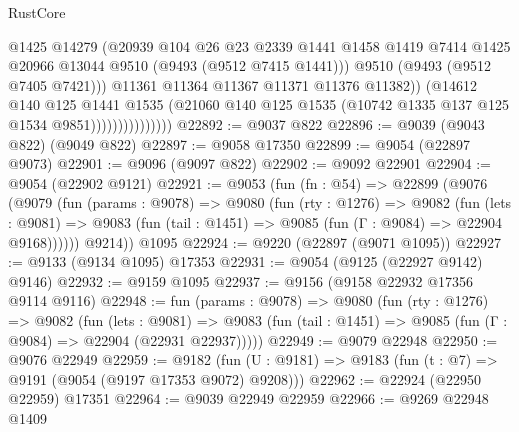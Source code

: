\begin{lexlean}{RustCore}
\begin{coremodule}
                                  @1425
                                  @14279
                                  (@20939
                                    @104
                                    @26
                                    @23
                                    @2339
                                    @1441
                                    @1458
                                    @1419
                                    @7414
                                    @1425
                                    @20966
                                    @13044
                                    @9510
                                    (@9493 (@9512 @7415 @1441)))
                                  @9510
                                  (@9493 (@9512 @7405 @7421)))
                                @11361
                                @11364
                                @11367
                                @11371
                                @11376
                                @11382))
                            (@14612
                              @140
                              @125
                              @1441
                              @1535
                              (@21060
                                @140
                                @125
                                @1535
                                (@10742 @1335 @137 @125 @1534 @9851)))))))))))))))
@22892 := @9037 @822
@22896 := @9039 (@9043 @822) (@9049 @822)
@22897 := @9058 @17350
@22899 := @9054 (@22897 @9073)
@22901 := @9096 (@9097 @822)
@22902 := @9092 @22901
@22904 := @9054 (@22902 @9121)
@22921 := @9053
    (fun (fn : @54) =>
    @22899
      (@9076
        (@9079
          (fun (params : @9078) =>
          @9080
            (fun (rty : @1276) =>
            @9082
              (fun (lets : @9081) =>
              @9083 (fun (tail : @1451) => @9085 (fun (Γ : @9084) => @22904 @9168))))))
        @9214))
    @1095
@22924 := @9220 (@22897 (@9071 @1095))
@22927 := @9133 (@9134 @1095) @17353
@22931 := @9054 (@9125 (@22927 @9142) @9146)
@22932 := @9159 @1095
@22937 := @9156 (@9158 @22932 @17356 @9114 @9116)
@22948 := fun (params : @9078) =>
  @9080
    (fun (rty : @1276) =>
    @9082
      (fun (lets : @9081) =>
      @9083 (fun (tail : @1451) => @9085 (fun (Γ : @9084) => @22904 (@22931 @22937)))))
@22949 := @9079 @22948
@22950 := @9076 @22949
@22959 := @9182
    (fun (U : @9181) => @9183 (fun (t : @7) => @9191 (@9054 (@9197 @17353 @9072) @9208)))
@22962 := @22924 (@22950 @22959) @17351
@22964 := @9039 @22949 @22959
@22966 := @9269 @22948 @1409

\end{coremodule}
\end{lexlean}
